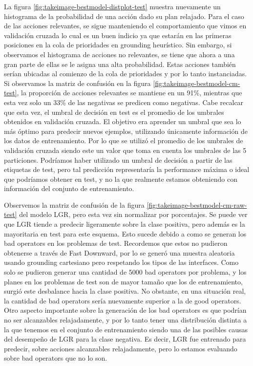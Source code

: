 La figura \ref{fig:takeimage-bestmodel-distplot-test} muestra nuevamente un
histograma de la probabilidad de una acción dado su plan relajado. Para el caso
de las acciones relevantes, se sigue manteniendo el comportamiento que vimos en
validación cruzada lo cual es un buen indicio ya que estarán en las primeras
posiciones en la cola de prioridades en grounding heurístico. Sin embargo, si
observamos el histograma de acciones no relevantes, se tiene que ahora a una
gran parte de ellas se le asigna una alta probabilidad. Estas acciones también
serían ubicadas al comienzo de la cola de prioridades y por lo tanto
instanciadas. Si observamos la matriz de confusión en la figura
\ref{fig:takeimage-bestmodel-cm-test}, la proporción de acciones relevantes se
mantiene en un 91\%, mientras que esta vez solo un 33\% de las negativas se
predicen como negativas. Cabe recalcar que esta vez, el umbral de decisión en
test es el promedio de los umbrales obtenidos en validación cruzada. El objetivo
era aprender un umbral que sea lo más óptimo para predecir nuevos ejemplos,
utilizando únicamente información de los datos de entrenamiento. Por lo que se
utilizó el promedio de los umbrales de validación cruzada siendo este un valor
que toma en cuenta los umbrales de las 5 particiones. Podríamos haber
utilizado un umbral de decisión a partir de las etiquetas de test, pero
tal predicción representaría la performance máxima o ideal que podríamos obtener
en test, y no la que realmente estamos obteniendo con información del conjunto
de entrenamiento.

Observemos la matriz de confusión de la figura
\ref{fig:takeimage-bestmodel-cm-raw-test} del modelo LGR, pero esta vez sin
normalizar por porcentajes. Se puede ver que LGR tiende a predecir ligeramente
sobre la clase positiva, pero además es la mayoritaria en test para este
esquema. Esto sucede debido a como se generan los bad operators en los problemas
de test. Recordemos que estos no pudieron obtenerse a través de Fast Downward,
por lo se generó una muestra aleatoria usando grounding cartesiano pero
respetando los tipos de las interfaces. Como solo se pudieron generar una
cantidad de 5000 bad operators por problema, y los planes en los problemas de
test son de mayor tamaño que los de entrenamiento, surgió este desbalance hacia
la clase positiva. No obstante, en una situación real, la cantidad de bad
operators sería nuevamente superior a la de good operators. Otro aspecto
importante sobre la generación de los bad operators es que podrían no ser
alcanzables relajadamente, y por lo tanto tener una distribución distinta a la
que tenemos en el conjunto de entrenamiento siendo una de las posibles causas
del desempeño de LGR para la clase negativa. Es decir, LGR fue entrenado para
predecir, sobre acciones alcanzables relajadamente, pero lo estamos evaluando
sobre bad operators que no lo son.


